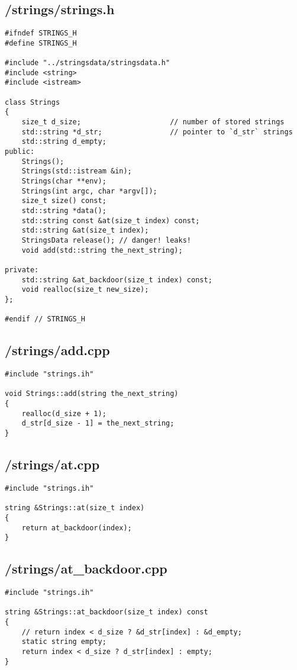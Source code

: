 \documentclass{article}
\begin{document}
\subsection*{/strings/strings.h}
\begin{verbatim}
#ifndef STRINGS_H
#define STRINGS_H

#include "../stringsdata/stringsdata.h"
#include <string>
#include <istream>

class Strings 
{
    size_t d_size;                     // number of stored strings
    std::string *d_str;                // pointer to `d_str` strings
    std::string d_empty;
public:
    Strings();
    Strings(std::istream &in);
    Strings(char **env);
    Strings(int argc, char *argv[]);
    size_t size() const;
    std::string *data();
    std::string const &at(size_t index) const;
    std::string &at(size_t index);
    StringsData release(); // danger! leaks!
    void add(std::string the_next_string);

private:
    std::string &at_backdoor(size_t index) const;
    void realloc(size_t new_size);
};

#endif // STRINGS_H

\end{verbatim}
\subsection*{/strings/add.cpp}
\begin{verbatim}
#include "strings.ih"

void Strings::add(string the_next_string)
{
    realloc(d_size + 1);
    d_str[d_size - 1] = the_next_string;
}
\end{verbatim}
\subsection*{/strings/at.cpp}
\begin{verbatim}
#include "strings.ih"

string &Strings::at(size_t index)
{
    return at_backdoor(index);
}
\end{verbatim}
\subsection*{/strings/at\_backdoor.cpp}
\begin{verbatim}
#include "strings.ih"

string &Strings::at_backdoor(size_t index) const
{
    // return index < d_size ? &d_str[index] : &d_empty;
    static string empty;
    return index < d_size ? d_str[index] : empty; 
}

\end{verbatim}
\end{document}
